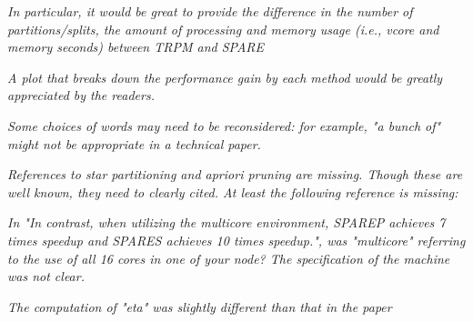 \emph{In particular, it would be great to provide the
difference in the number of partitions/splits, the amount of processing and
memory usage (i.e., vcore and memory seconds) between TRPM and SPARE}



\emph{A plot that breaks down the performance gain by each method would
be greatly appreciated by the readers.}


\emph{Some choices of words may need to be reconsidered: for example, "a bunch
of" might not be appropriate in a technical paper.}



\emph{References to star partitioning and apriori pruning are missing. Though these
are well known, they need to clearly cited. At least the following reference is
missing:}


\emph{In "In contrast, when utilizing the multicore
environment, SPAREP achieves 7 times speedup and SPARES achieves 10 times speedup.", was "multicore"
referring to the use of all 16 cores in one of your node? The specification of the machine was not clear.}



\emph{The computation of "eta" was slightly different than that in the paper}

